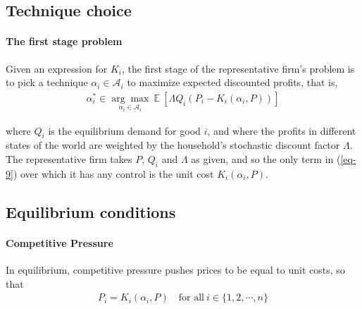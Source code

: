 \documentclass[11pt]{article}
\theoremstyle{definition}
\begin{document}
	\subsection{Technique choice}
	\paragraph{The first stage problem} 
	Given an expression for $K_i$, the first stage of the representative firm’s problem is to pick a technique $\alpha_i\in \mathcal{A}_i$ to maximize expected discounted profits, that is,
	\begin{align}
		\alpha_i^* \in \underset{\alpha_i \in \mathcal{A}_i}{\arg\max}\ \mathbb{E}\ [\Lambda Q_i (P_i - K_i(\alpha_i, P))] \label{eq-9}
	\end{align}
	
	where $Q_i$ is the equilibrium demand for good $i$, and where the profits in different states of the world are weighted by the household’s stochastic discount factor $\Lambda$. The representative firm takes $P$, $Q_i$ and $\Lambda$ as given, and so the only term in (\ref{eq-9}) over which it has any control is the unit cost $K_i(\alpha_i, P)$.
	
	\subsection{Equilibrium conditions}
	\paragraph{Competitive Pressure} 
	In equilibrium, competitive pressure pushes prices to be equal to unit costs, so that
	\begin{align}
		P_i = K_i(\alpha_i, P) \quad \text{for all} \ i\in\{1,2,\cdots, n\} \label{eq-10}
	\end{align}
	
\end{document}

